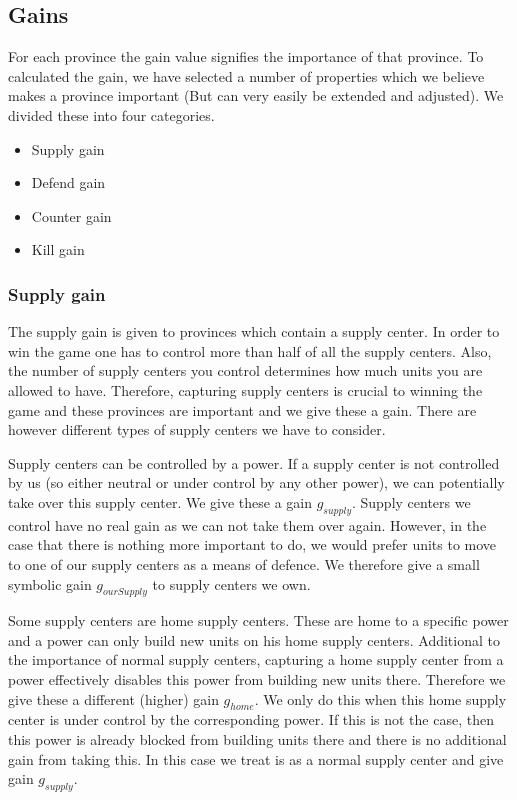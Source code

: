 \documentclass[a4paper]{article} %
\begin{document}
\subsection{Gains}  

For each province the gain value signifies the importance of that province. To calculated the gain, we have selected a number of properties which we believe makes a province important (But can very easily be extended and adjusted). We divided these into four categories. 

\begin{itemize}
\item Supply gain
\item Defend gain
\item Counter gain
\item Kill gain
\end{itemize}

\subsubsection{Supply gain}
\label{sec:supplygain}
The supply gain is given to provinces which contain a supply center. In order to win the game one has to control more than half of all the supply centers. Also, the number of supply centers you control determines how much units you are allowed to have. Therefore, capturing supply centers is crucial to winning the game and these provinces are important and we give these a gain. There are however different types of supply centers we have to consider. 

Supply centers can be controlled by a power. If a supply center is not controlled by us (so either neutral or under control by any other power), we can potentially take over this supply center. We give these a gain $g_{supply}$. Supply centers we control have no real gain as we can not take them over again. However, in the case that there is nothing more important to do, we would prefer units to move to one of our supply centers as a means of defence. We therefore give a small symbolic gain $g_{ourSupply}$ to supply centers we own. 

Some supply centers are home supply centers. These are home to a specific power and a power can only build new units on his home supply centers. Additional to the importance of normal supply centers, capturing a home supply center from a power effectively disables this power from building new units there. Therefore we give these a different (higher) gain $g_{home}$. We only do this when this home supply center is under control by the corresponding power. If this is not the case, then this power is already blocked from building units there and there is no additional gain from taking this. In this case we treat is as a normal supply center and give gain $g_{supply}$.
\end{document}

